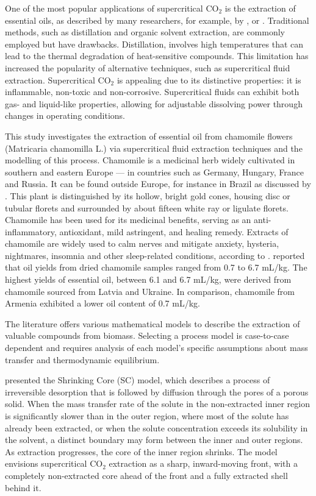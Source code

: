 \documentclass[a4paper,fleqn]{cas-dc}
\begin{document}
One of the most popular applications of supercritical CO$_2$ is the extraction of essential oils, as described by many researchers, for example, by \citet{Sodeifian2017}, \citet{Reverchon1993} or \citet{Sovova1994}. Traditional methods, such as distillation and organic solvent extraction, are commonly employed but have drawbacks. Distillation, involves high temperatures that can lead to the thermal degradation of heat-sensitive compounds. This limitation has increased the popularity of alternative techniques, such as supercritical fluid extraction. Supercritical CO$_2$ is appealing due to its distinctive properties: it is inflammable, non-toxic and non-corrosive. Supercritical fluids can exhibit both gas- and liquid-like properties, allowing for adjustable dissolving power through changes in operating conditions.


This study investigates the extraction of essential oil from chamomile flowers (Matricaria chamomilla L.) via supercritical fluid extraction techniques and the modelling of this process. Chamomile is a medicinal herb widely cultivated in southern and eastern Europe — in countries such as Germany, Hungary, France and Russia. It can be found outside Europe, for instance in Brazil as discussed by \citet{Singh2011}. This plant is distinguished by its hollow, bright gold cones, housing disc or tubular florets and surrounded by about fifteen white ray or ligulate florets. Chamomile has been used for its medicinal benefits, serving as an anti-inflammatory, antioxidant, mild astringent, and healing remedy. Extracts of chamomile are widely used to calm nerves and mitigate anxiety, hysteria, nightmares, insomnia and other sleep-related conditions, according to \citet{Srivastava2009}. \citet{Orav2010} reported that oil yields from dried chamomile samples ranged from 0.7 to 6.7 mL/kg. The highest yields of essential oil, between 6.1 and 6.7 mL/kg, were derived from chamomile sourced from Latvia and Ukraine. In comparison, chamomile from Armenia exhibited a lower oil content of 0.7 mL/kg.

The literature offers various mathematical models to describe the extraction of valuable compounds from biomass. Selecting a process model is case-to-case dependent and requires analysis of each model's specific assumptions about mass transfer and thermodynamic equilibrium.

\citet{Goto1996} presented the Shrinking Core (SC) model, which describes a process of irreversible desorption that is followed by diffusion through the pores of a porous solid. When the mass transfer rate of the solute in the non-extracted inner region is significantly slower than in the outer region, where most of the solute has already been extracted, or when the solute concentration exceeds its solubility in the solvent, a distinct boundary may form between the inner and outer regions. As extraction progresses, the core of the inner region shrinks. The model envisions supercritical CO$_2$ extraction as a sharp, inward-moving front, with a completely non-extracted core ahead of the front and a fully extracted shell behind it.
	
\end{document}
